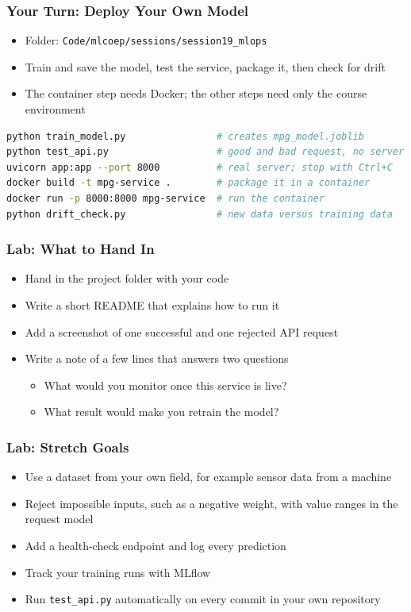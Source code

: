 \begin{frame}[fragile]\frametitle{Your Turn: Deploy Your Own Model}
\begin{itemize}
\item Folder: \texttt{Code/mlcoep/sessions/session19\_mlops}
\item Train and save the model, test the service, package it, then check for drift
\item The container step needs Docker; the other steps need only the course environment
\end{itemize}
\begin{lstlisting}[language=bash]
python train_model.py                # creates mpg_model.joblib
python test_api.py                   # good and bad request, no server
uvicorn app:app --port 8000          # real server; stop with Ctrl+C
docker build -t mpg-service .        # package it in a container
docker run -p 8000:8000 mpg-service  # run the container
python drift_check.py                # new data versus training data
\end{lstlisting}
\end{frame}

\begin{frame}[fragile]\frametitle{Lab: What to Hand In}
\begin{itemize}
\item Hand in the project folder with your code
\item Write a short README that explains how to run it
\item Add a screenshot of one successful and one rejected API request
\item Write a note of a few lines that answers two questions
\begin{itemize}
\item What would you monitor once this service is live?
\item What result would make you retrain the model?
\end{itemize}
\end{itemize}
\end{frame}

\begin{frame}[fragile]\frametitle{Lab: Stretch Goals}
\begin{itemize}
\item Use a dataset from your own field, for example sensor data from a machine
\item Reject impossible inputs, such as a negative weight, with value ranges in the request model
\item Add a health-check endpoint and log every prediction
\item Track your training runs with MLflow
\item Run \texttt{test\_api.py} automatically on every commit in your own repository
\end{itemize}
\end{frame}
